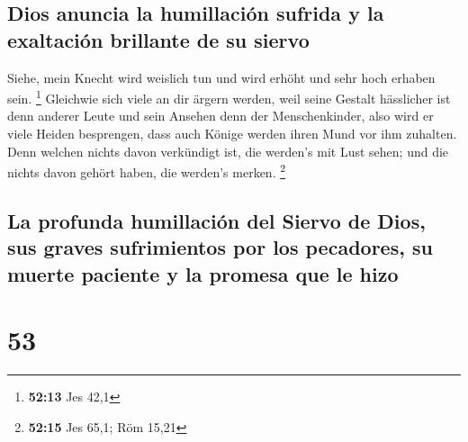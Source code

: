 \hypertarget{dios-anuncia-la-humillaciuxf3n-sufrida-y-la-exaltaciuxf3n-brillante-de-su-siervo}{%
\subsection{Dios anuncia la humillación sufrida y la exaltación
brillante de su
siervo}\label{dios-anuncia-la-humillaciuxf3n-sufrida-y-la-exaltaciuxf3n-brillante-de-su-siervo}}

 Siehe, mein Knecht wird weislich tun und wird erhöht und
sehr hoch erhaben sein. \footnote{\textbf{52:13} Jes 42,1}
 Gleichwie sich viele an dir ärgern werden, weil seine
Gestalt hässlicher ist denn anderer Leute und sein Ansehen denn der
Menschenkinder,  also wird er viele Heiden besprengen,
dass auch Könige werden ihren Mund vor ihm zuhalten. Denn welchen nichts
davon verkündigt ist, die werden's mit Lust sehen; und die nichts davon
gehört haben, die werden's merken. \footnote{\textbf{52:15} Jes 65,1;
  Röm 15,21}

\hypertarget{la-profunda-humillaciuxf3n-del-siervo-de-dios-sus-graves-sufrimientos-por-los-pecadores-su-muerte-paciente-y-la-promesa-que-le-hizo}{%
\subsection{La profunda humillación del Siervo de Dios, sus graves
sufrimientos por los pecadores, su muerte paciente y la promesa que le
hizo}\label{la-profunda-humillaciuxf3n-del-siervo-de-dios-sus-graves-sufrimientos-por-los-pecadores-su-muerte-paciente-y-la-promesa-que-le-hizo}}

\hypertarget{section-52}{%
\section{53}\label{section-52}}

